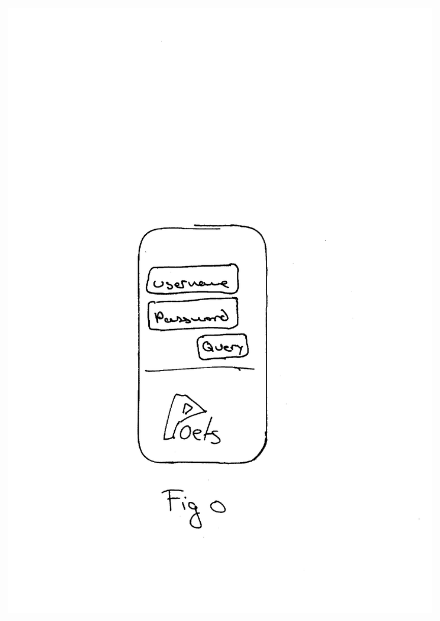 \documentclass[envcountsame]{llncs}
\begin{document}
\begin{figure}[bth]
{    {\includegraphics[scale=0.80]{gfx/logon}}}\\
\end{figure}
\end{document}
